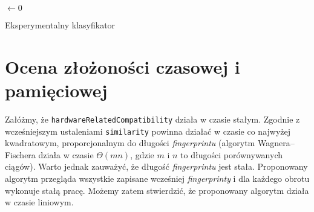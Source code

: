 
\begin{algorithm}
	\SetAlgoVlined
	\BlankLine
	\BlankLine
	\VarMax $\leftarrow 0$\;
	\ForEach{\VarG $\in$ \SetG}{
		\If{\HardwareRelatedCompatibility{\VarF, \VarG} $< \alpha$}{
			\Continue\;
		}
		\BlankLine
		\VarRatio $\leftarrow$ \Similarity{\VarF, \VarG}\;
		\BlankLine
		\If{\VarRatio $>$ \VarMax}{
			\VarMax $\leftarrow$ \VarRatio\;
			\VarCandidate $\leftarrow$ \VarG\;
		}
	}
	\If{\VarMax $\ge \beta$}{
		\Return{\VarCandidate}\;
	}
	\Return{\Null}\;
	\caption{Eksperymentalny klasyfikator}
\end{algorithm}



\section{Ocena złożoności czasowej i pamięciowej}
Załóżmy, że \texttt{hardwareRelatedCompatibility} działa w czasie stałym.
Zgodnie z wcześniejszym ustaleniami \texttt{similarity} powinna działać w czasie
co najwyżej kwadratowym, proporcjonalnym do długości \emph{fingerprintu}
(algorytm Wagnera--Fischera działa w czasie \(\Theta(mn)\), gdzie \(m\) i \(n\)
to długości porównywanych ciągów). Warto jednak zauważyć, że długość
\emph{fingerprintu} jest stała. Proponowany algorytm przegląda wszystkie
zapisane wcześniej \emph{fingerprinty} i dla każdego obrotu wykonuje stałą
pracę. Możemy zatem stwierdzić, że proponowany algorytm działa w czasie
liniowym.

